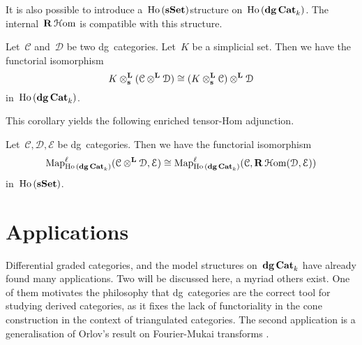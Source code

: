 \begin{refsection}
It is also possible to introduce a~$\operatorname{\mathrm{Ho} \,}(\mathbf{s\,\!\mathbf{Set}})$\dash structure on~$\operatorname{\mathrm{Ho} \,}(\mathbf{dg\,Cat}_k)$. The internal~$\mathbf{R}\operatorname{\mathcal{H}om}$ is compatible with this structure.
\begin{corollary}
  \label{corollary:simplicial-compatibility}
  Let~$\mathcal{C}$ and~$\mathcal{D}$ be two dg~categories. Let~$K$ be a simplicial set. Then we have the functorial isomorphism
  \begin{equation}
    K\otimes^{\mathbf{L}}_{\mathbf{s}}(\mathcal{C}\otimes^{\mathbf{L}}\mathcal{D})\cong(K\otimes^{\mathbf{L}}_{\mathbf{s}}\mathcal{C})\otimes^{\mathbf{L}}\mathcal{D}
  \end{equation}
  in~$\operatorname{\mathrm{Ho} \,}(\mathbf{dg\,Cat}_k)$.
\end{corollary}
This corollary yields the following enriched tensor-Hom adjunction.
\begin{corollary}
  \label{corollary:internal-Hom-Map-adjointness}
  Let~$\mathcal{C},\mathcal{D},\mathcal{E}$ be dg~categories. Then we have the functorial isomorphism
  \begin{equation}
    \label{equation:internal-Hom-Map-adjointness}
    \operatorname{\mathrm{Map}}_{\operatorname{\mathrm{Ho} \,}(\mathbf{dg\,Cat}_k)}^\ell(\mathcal{C}\otimes^{\mathbf{L}}\mathcal{D},\mathcal{E})\cong\operatorname{\mathrm{Map}}_{\operatorname{\mathrm{Ho} \,}(\mathbf{dg\,Cat}_k)}^\ell(\mathcal{C},\mathbf{R}\operatorname{\mathcal{H}om}(\mathcal{D},\mathcal{E}))
  \end{equation}
  in~$\operatorname{\mathrm{Ho} \,}(\mathbf{s\,\!\mathbf{Set}})$.
\end{corollary}


\section{Applications}
Differential graded categories, and the model structures on~$\mathbf{dg\,Cat}_k$ have already found many applications. Two will be discussed here, a myriad others exist. One of them motivates the philosophy that dg~categories are the correct tool for studying derived categories, as it fixes the lack of functoriality in the cone construction in the context of triangulated categories. The second application is a generalisation of Orlov's result on Fourier-Mukai transforms \cite{orlov}.


\end{refsection}
